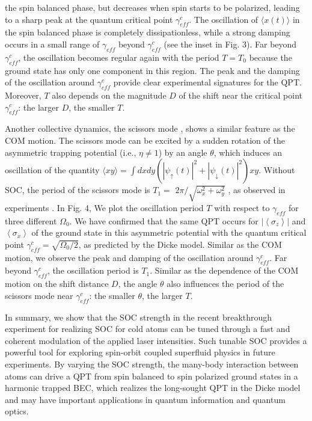 \documentclass[prl,twocolumn,superscriptaddress,showpacs,floatfix]{revtex4}
\begin{document}
the spin balanced phase, but decreases when spin starts to be polarized,
leading to a sharp peak at the quantum critical point $\gamma _{eff}^{c}$.
The oscillation of $\langle x\left( t\right) \rangle $ in the spin balanced
phase is completely dissipationless, while a strong damping occurs in a
small range of $\gamma _{eff}$ beyond $\gamma _{eff}^{c}$ (see the inset in
Fig. 3). Far beyond $\gamma _{eff}^{c}$, the oscillation becomes regular
again with the period $T=T_{0}$ because the ground state has only one
component in this region. The peak and the damping of the oscillation around
$\gamma _{eff}^{c}$ provide clear experimental signatures for the QPT.
Moreover, $T$ also depends on the magnitude $D$ of the shift near the
critical point $\gamma _{eff}^{c}$: the larger $D$, the smaller $T$.

Another collective dynamics, the scissors mode \cite{Odelin}, shows a
similar feature as the COM motion. The scissors mode can be excited by a
sudden rotation of the asymmetric trapping potential (i.e., $\eta \neq 1$)
by an angle $\theta $, which induces an oscillation of the quantity $\langle
xy\rangle =\int dxdy(|\psi _{\uparrow }(t)|^{2}+|\psi _{\downarrow
}(t)|^{2})xy$. Without SOC, the period of the scissors mode is $T_{1}=$ $%
2\pi /\sqrt{\omega _{x}^{2}+\omega _{y}^{2}}$ \cite{Odelin}, as observed in
experiments \cite{Marago}. In Fig. 4, We plot the oscillation period $T$
with respect to $\gamma _{eff}$ for three different $\Omega _{0}$. We have
confirmed that the same QPT occurs for $\left\vert \left\langle \sigma
_{z}\right\rangle \right\vert $ and $\left\langle \sigma _{x}\right\rangle $
of the ground state in this asymmetric potential with the quantum critical
point $\gamma _{eff}^{c}=\sqrt{\Omega _{0}/2}$, as predicted by the Dicke
model. Similar as the COM motion, we observe the peak and damping of the
oscillation around $\gamma _{eff}^{c}$. Far beyond $\gamma _{eff}^{c}$, the
oscillation period is $T_{1}$. Similar as the dependence of the COM motion
on the shift distance $D$, the angle $\theta $ also influences the period of
the scissors mode near $\gamma _{eff}^{c}$: the smaller $\theta $, the
larger $T$.

In summary, we show that the SOC strength in the recent breakthrough
experiment for realizing SOC for cold atoms can be tuned through a fast and
coherent modulation of the applied laser intensities. Such tunable SOC
provides a powerful tool for exploring spin-orbit coupled superfluid physics
in future experiments. By varying the SOC strength, the many-body
interaction between atoms can drive a QPT from spin balanced to spin
polarized ground states in a harmonic trapped BEC, which realizes the
long-sought QPT in the Dicke model and may have important applications in
quantum information and quantum optics.
\end{document}
